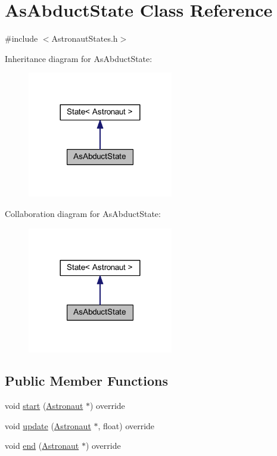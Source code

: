 \hypertarget{class_as_abduct_state}{}\section{As\+Abduct\+State Class Reference}
\label{class_as_abduct_state}


{\ttfamily \#include $<$Astronaut\+States.\+h$>$}



Inheritance diagram for As\+Abduct\+State\+:
\nopagebreak
\begin{figure}[H]
\begin{center}
\leavevmode
\includegraphics[width=180pt]{class_as_abduct_state__inherit__graph}
\end{center}
\end{figure}


Collaboration diagram for As\+Abduct\+State\+:
\nopagebreak
\begin{figure}[H]
\begin{center}
\leavevmode
\includegraphics[width=180pt]{class_as_abduct_state__coll__graph}
\end{center}
\end{figure}
\subsection*{Public Member Functions}
\begin{DoxyCompactItemize}
\item 
void \hyperlink{class_as_abduct_state_afad21e00707545b221d707932b22375e}{start} (\hyperlink{class_astronaut}{Astronaut} $\ast$) override
\item 
void \hyperlink{class_as_abduct_state_a5d1f94854fc9ef5e4cc35734ad691660}{update} (\hyperlink{class_astronaut}{Astronaut} $\ast$, float) override
\item 
void \hyperlink{class_as_abduct_state_a28ceb4aad2ec8dc1c07c584cf9f9778f}{end} (\hyperlink{class_astronaut}{Astronaut} $\ast$) override
\end{DoxyCompactItemize}
